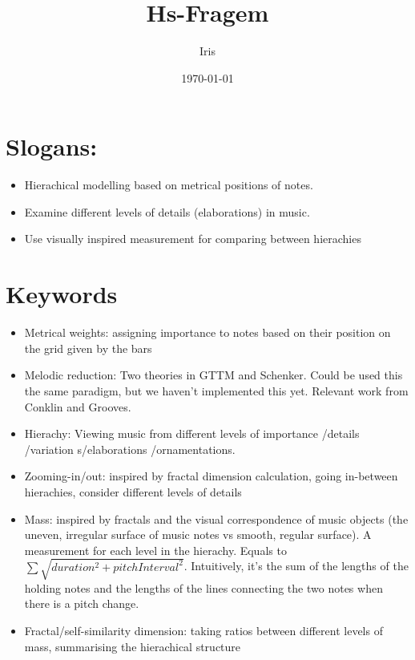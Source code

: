 \documentclass[11pt]{article}
\author{Iris}
\date{\today}
\title{Hs-Fragem}
\begin{document}
\maketitle
\tableofcontents

\section*{Slogans:}
\label{sec:org0680de9}
\begin{itemize}
\item Hierachical modelling based on metrical positions of notes.
\item Examine different levels of details (elaborations) in music.
\item Use visually inspired measurement for comparing between hierachies
\end{itemize}

\section*{Keywords}
\label{sec:orgac07f33}
\begin{itemize}
\item Metrical weights: assigning importance to notes based on their position on the grid given by the bars
\item Melodic reduction: Two theories in GTTM and Schenker. Could be used this the same paradigm, but we haven't implemented this yet. Relevant work from Conklin and Grooves.
\item Hierachy: Viewing music from different levels of importance /details /variation s/elaborations /ornamentations.
\item Zooming-in/out: inspired by fractal dimension calculation, going in-between hierachies, consider different levels of details
\item Mass: inspired by fractals and the visual correspondence of music objects (the uneven, irregular surface of music notes vs smooth, regular surface). A measurement for each level in the hierachy. Equals to \(\sum \sqrt{duration^2 + pitchInterval^2}\). Intuitively, it's the sum of the lengths of the holding notes and the lengths of the lines connecting the two notes when there is a pitch change.
\item Fractal/self-similarity dimension: taking ratios between different levels of mass, summarising the hierachical structure
\end{itemize}
\end{document}
